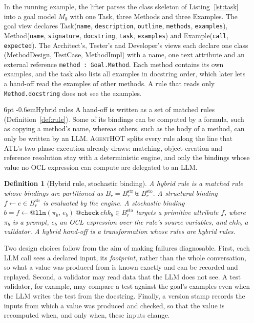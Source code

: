 \documentclass[pdflatex,sn-mathphys-num]{sn-jnl}
\makeatletter
\theoremstyle{thmstyleone}%
\theoremstyle{thmstyletwo}%
\theoremstyle{thmstylethree}%
\newtheorem{definition}{Definition}%
\newcommand{\tool}{\textsc{AgentHOT}}
\newcommand{\chk}{\mathit{chk}}
\newcommand{\cls}[1]{\textsf{#1}}
\newcommand{\code}[1]{\texttt{#1}}
\renewcommand\paragraph{\@startsection{paragraph}{4}{\z@}%
  {6pt \@plus 2pt \@minus 1pt}{-0.6em}{\normalfont\normalsize\bfseries}}
\makeatother
\begin{document}
In the running example, the lifter parses the class skeleton of
Listing~\ref{lst:task} into a goal model $M_0$ with one \cls{Task}, three
\cls{Method}s and three \cls{Example}s. The goal view declares
\cls{Task}(\code{name}, \code{description}, \code{outline}, \code{methods},
\code{examples}), \cls{Method}(\code{name}, \code{signature}, \code{docstring},
\code{task}, \code{examples}) and \cls{Example}(\code{call}, \code{expected}).
The Architect's, Tester's and Developer's views each declare one class
(\cls{MethodDesign}, \cls{TestCase}, \cls{MethodImpl}) with a name, one text
attribute and an external reference \code{method : Goal.Method}. Each method
contains its own examples, and the task also lists all examples in docstring
order, which later lets a hand-off read the examples of other methods.
A rule that reads only \code{Method.docstring} does not see the examples.

\paragraph{Hybrid rules} A hand-off is written as a set of matched rules
(Definition~\ref{def:rule}). Some of its bindings can be computed by a formula,
such as copying a method's name, whereas others, such as the body of a method,
can only be written by an LLM. \tool{} splits every rule along the line that ATL's
two-phase execution already draws: matching, object creation and reference
resolution stay with a deterministic engine, and only the bindings whose value
no OCL expression can compute are delegated to an LLM.

\begin{definition}[Hybrid rule, stochastic binding]\label{def:hybrid}
A hybrid rule is a matched rule whose bindings are partitioned as
$B_r=B_r^{\mathrm{str}}\uplus B_r^{\mathrm{sto}}$. A \emph{structural} binding
$f\leftarrow e\in B_r^{\mathrm{str}}$ is evaluated by the engine. A
\emph{stochastic} binding
$b=f\leftarrow\texttt{@llm}(\pi_b,\,e_b)\ \texttt{@check}\ \chk_b\in B_r^{\mathrm{sto}}$
targets a primitive attribute $f$, where $\pi_b$ is a prompt, $e_b$ an OCL
expression over the rule's source variables, and $\chk_b$ a validator. A \emph{hybrid
hand-off} is a transformation whose rules are hybrid rules.
\end{definition}

Two design choices follow from the aim of making failures diagnosable. First,
each LLM call sees a declared input, its \emph{footprint}, rather than the
whole conversation, so what a value was produced from is known exactly and
can be recorded and replayed. Second, a validator may read data that the LLM
does not see. A test validator, for example, may compare a test against the
goal's examples even when the LLM writes the test from the docstring. Finally,
a version stamp records the inputs from which a value was produced and checked,
so that the value is recomputed when, and only when, these inputs change.
\end{document}
